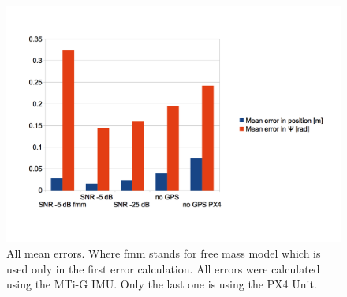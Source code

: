 \begin{figure}[hb]
\centering
\includegraphics[width=1\textwidth]{pictures/mean_error_2.png}
\caption{All mean errors. Where fmm stands for free mass model which is used only in the first error calculation. All errors were calculated using the MTi-G IMU. Only the last one is using the PX4 Unit.}
\label{mean_error}
\end{figure}





